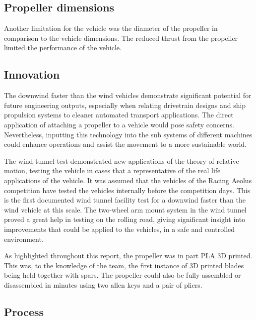 \subsection{Propeller dimensions}
 
Another limitation for the vehicle was the diameter of the propeller in comparison to the vehicle dimensions. The reduced thrust from the propeller limited the performance of the vehicle.

\subsection{Innovation}

The downwind faster than the wind vehicles demonstrate significant potential for future engineering outputs, especially when relating drivetrain designs and ship propulsion systems to cleaner automated transport applications. The direct application of attaching a propeller to a vehicle would pose safety concerns. Nevertheless, inputting this technology into the sub systems of different machines could enhance operations and assist the movement to a more sustainable world.

The wind tunnel test demonstrated new applications of the theory of relative motion, testing the vehicle in cases that a representative of the real life applications of the vehicle. It was assumed that the vehicles of the Racing Aeolus competition have tested the vehicles internally before the competition days. This is the first documented wind tunnel facility test for a downwind faster than the wind vehicle at this scale. The two-wheel arm mount system in the wind tunnel proved a great help in testing on the rolling road, giving significant insight into improvements that could be applied to the vehicles, in a safe and controlled environment.

As highlighted throughout this report, the propeller was in part PLA 3D printed. This was, to the knowledge of the team, the first instance of 3D printed blades being held together with spars. The propeller could also be fully assembled or disassembled in minutes using two allen keys and a pair of pliers.

\subsection{Process}

